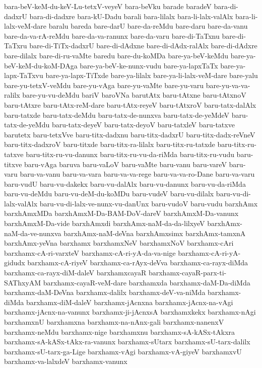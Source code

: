{bara-beV-keM-du-keV-Lu-tetxV-veyeV
bara-beVku
barade
baradeV
bara-di-dadxrU
bara-di-dadxre
bara-kU-Dadu
barali
bara-lilalx
bara-li-lalx-valAlx
bara-li-lalx-veM-dare
baralu
bareda
bare-darU
bare-da-reMdu
bare-daru
bare-da-vanu
bare-da-va-rA-reMdu
bare-da-va-ranunx
bare-da-varu
bare-di-TaTxnu
bare-di-TaTxru
bare-di-TiTx-dadxrU
bare-di-dAdxne
bare-di-dAdx-ralAlx
bare-di-dAdxre
bare-dilalx
bare-di-ru-vaMte
baredu
bare-du-koMDa
bare-ya-beV-keMdu
bare-ya-beV-keM-du-koM-DAga
bare-ya-beV-ke-nunx-vudu
bare-ya-lapxTaTx
bare-ya-lapx-TaTxvu
bare-ya-lapx-TiTxde
bare-ya-lilalx
bare-ya-li-lalx-veM-dare
bare-yalu
bare-yu-tetxV-veMdu
bare-yu-vAga
bare-yu-vaMte
bare-yu-varu
bare-yu-va-va-ralilx
bare-yu-vu-deMdu
bariV
baroVNa
barutAtx
baru-tAtxne
baru-tAtxnoV
baru-tAtxre
baru-tAtx-reM-dare
baru-tAtx-reyeV
baru-tAtxroV
baru-tatx-dalAlx
baru-tatxde
baru-tatx-deMdu
baru-tatx-de-nunxva
baru-tatx-de-yeMdeV
baru-tatx-de-yeMdu
baru-tatx-deyeV
baru-tatx-deyoV
baru-tatxleV
baru-tatxve
barutetx
baru-tetxVve
baru-titx-dadxnu
baru-titx-dadxrU
baru-titx-dadx-reVneV
baru-titx-dadxroV
baru-titxde
baru-titx-ra-lilalx
baru-titx-ru-tatxde
baru-titx-ru-tatxve
baru-titx-ru-vu-danunx
baru-titx-ru-vu-da-riMda
baru-titx-ru-vudu
baru-titxve
baru-vAga
baruva
baru-vaLoV
baru-vaMte
baru-vanu
baru-vareV
baru-varu
baru-va-vanu
baru-va-vara
baru-va-va-rege
baru-va-va-ro-Dane
baru-va-varu
baru-vudU
baru-vu-dakekx
baru-vu-dalAlx
baru-vu-danunx
baru-vu-da-riMda
baru-vu-deMdu
baru-vu-deM-du-koMDu
baru-vudeV
baru-vu-dilalx
baru-vu-di-lalx-valAlx
baru-vu-di-lalx-ve-nunx-vu-danUnx
baru-vudoV
baru-vudu
barxhAmx
barxhAmxMDa
barxhAmxM-Da-BAM-DoV-dareV
barxhAmxM-Da-vanunx
barxhAmxM-Da-vide
barxhAmxdi
barxhAmx-naM-da-da-lilxyeV
barxhAmx-naM-da-ve-nunxva
barxhAmx-naM-deVna
barxhAmxsimx
barxhAmx-tamxnA
barxhAmx-yeVna
barxhamx
barxhamxNeV
barxhamxNoV
barxhamx-cAri
barxhamx-cA-ri-varxteV
barxhamx-cA-ri-yA-da-va-nige
barxhamx-cA-ri-yA-gidudx
barxhamx-cA-riyeV
barxhamx-ca-rAyx-deVva
barxhamx-ca-rayx-diMda
barxhamx-ca-rayx-diM-daleV
barxhamxcayaR
barxhamx-cayaR-parx-ti-SAThxyAM
barxhamx-cayaR-veM-dare
barxhamxda
barxhamx-daM-Da-diMda
barxhamx-daM-DeVna
barxhamx-dalilx
barxhamx-deV-va-niMda
barxhamx-diMda
barxhamx-diM-daleV
barxhamx-jAcnxna
barxhamx-jAcnx-na-vAgi
barxhamx-jAcnx-na-vanunx
barxhamx-ji-jAcnxsA
barxhamxkekx
barxhamx-nAgi
barxhamxnU
barxhamxna
barxhamx-na-nAnx-gali
barxhamx-nanenxV
barxhamx-neMdu
barxhamx-nige
barxhamxnu
barxhamx-sA-kASx-tAkxra
barxhamx-sA-kASx-tAkx-ra-vanunx
barxhamx-sUtarx
barxhamx-sU-tarx-dalilx
barxhamx-sU-tarx-ga-Lige
barxhamx-vAgi
barxhamx-vA-giyeV
barxhamxvU
barxhamx-va-lalxdeV
barxhamx-vanunx
}
